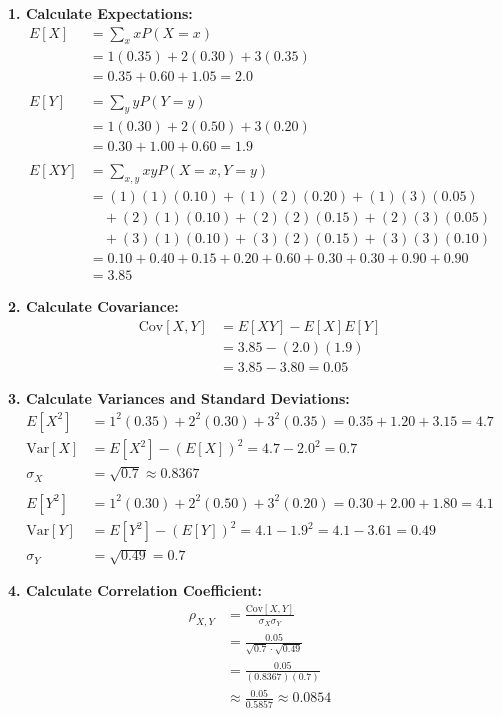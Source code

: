 \documentclass{article}
\begin{document}
\textbf{1. Calculate Expectations:}
\begin{align*}
    E[X] &= \sum_{x} x P(X=x) \\
         &= 1(0.35) + 2(0.30) + 3(0.35) \\
         &= 0.35 + 0.60 + 1.05 = \mathbf{2.0} \\
    \\
    E[Y] &= \sum_{y} y P(Y=y) \\
         &= 1(0.30) + 2(0.50) + 3(0.20) \\
         &= 0.30 + 1.00 + 0.60 = \mathbf{1.9} \\
    \\
    E[XY] &= \sum_{x,y} xy P(X=x, Y=y) \\
          &= (1)(1)(0.10) + (1)(2)(0.20) + (1)(3)(0.05) \\
          &\quad + (2)(1)(0.10) + (2)(2)(0.15) + (2)(3)(0.05) \\
          &\quad + (3)(1)(0.10) + (3)(2)(0.15) + (3)(3)(0.10) \\
          &= 0.10 + 0.40 + 0.15 + 0.20 + 0.60 + 0.30 + 0.30 + 0.90 + 0.90 \\
          &= \mathbf{3.85}
\end{align*}

\textbf{2. Calculate Covariance:}
\begin{align*}
    \text{Cov}[X, Y] &= E[XY] - E[X]E[Y] \\
                   &= 3.85 - (2.0)(1.9) \\
                   &= 3.85 - 3.80 = \mathbf{0.05}
\end{align*}

\textbf{3. Calculate Variances and Standard Deviations:}
\begin{align*}
    E[X^2] &= 1^2(0.35) + 2^2(0.30) + 3^2(0.35) = 0.35 + 1.20 + 3.15 = 4.7 \\
    \text{Var}[X] &= E[X^2] - (E[X])^2 = 4.7 - 2.0^2 = 0.7 \\
    \sigma_X &= \sqrt{0.7} \approx 0.8367 \\
    \\
    E[Y^2] &= 1^2(0.30) + 2^2(0.50) + 3^2(0.20) = 0.30 + 2.00 + 1.80 = 4.1 \\
    \text{Var}[Y] &= E[Y^2] - (E[Y])^2 = 4.1 - 1.9^2 = 4.1 - 3.61 = 0.49 \\
    \sigma_Y &= \sqrt{0.49} = 0.7
\end{align*}

\textbf{4. Calculate Correlation Coefficient:}
\begin{align*}
    \rho_{X, Y} &= \frac{\text{Cov}[X, Y]}{\sigma_X \sigma_Y} \\
               &= \frac{0.05}{\sqrt{0.7} \cdot \sqrt{0.49}} \\
               &= \frac{0.05}{(0.8367)(0.7)} \\
               &\approx \frac{0.05}{0.5857} \approx \mathbf{0.0854}
\end{align*}
\end{document}
